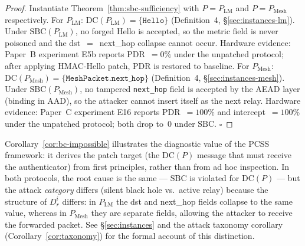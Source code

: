 \begin{proof}
Instantiate Theorem~\ref{thm:sbc-sufficiency} with $P = P_{\mathrm{LM}}$ and
$P = P_{\mathrm{Mesh}}$ respectively.
For $P_{\mathrm{LM}}$: $\mathrm{DC}(P_{\mathrm{LM}}) = \{\texttt{Hello}\}$
(Definition~4, §\ref{sec:instances-lm}).
Under $\mathrm{SBC}(P_{\mathrm{LM}})$, no forged Hello is accepted, so the
metric field is never poisoned and the dst~$=$~next\_hop collapse cannot occur.
Hardware evidence: Paper~B experiment E5b reports PDR~$= 0\%$ under the
unpatched protocol; after applying HMAC-Hello patch, PDR is restored to baseline.
For $P_{\mathrm{Mesh}}$: $\mathrm{DC}(P_{\mathrm{Mesh}}) = \{\texttt{MeshPacket.next\_hop}\}$
(Definition~4, §\ref{sec:instances-mesh}).
Under $\mathrm{SBC}(P_{\mathrm{Mesh}})$, no tampered \texttt{next\_hop} field
is accepted by the AEAD layer (binding in AAD), so the attacker cannot insert
itself as the next relay.
Hardware evidence: Paper~C experiment E16 reports PDR~$= 100\%$ and intercept~$= 100\%$
under the unpatched protocol; both drop to~0 under $\mathrm{SBC}$.
\hfill$\square$
\end{proof}

\begin{remark}
Corollary~\ref{cor:bc-impossible} illustrates the diagnostic value of the
PCSS framework: it derives the patch target (the DC$(P)$ message that must
receive the authenticator) from first principles, rather than from ad hoc
inspection.
In both protocols, the root cause is the same --- SBC is violated for
$\mathrm{DC}(P)$ --- but the attack \emph{category} differs (silent black hole
vs.\ active relay) because the structure of $D_{r}^{i}$ differs: in
$P_{\mathrm{LM}}$ the dst and next\_hop fields collapse to the same value,
whereas in $P_{\mathrm{Mesh}}$ they are separate fields, allowing the attacker
to receive the forwarded packet.
See §\ref{sec:instances} and the attack taxonomy corollary
(Corollary~\ref{cor:taxonomy}) for the formal account of this distinction.
\end{remark}
